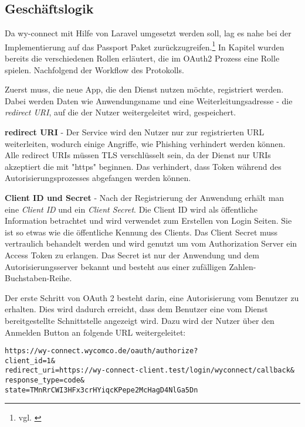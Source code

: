 
\subsection{Geschäftslogik}
\label{sec:Geschaeftslogik}

Da wy-connect mit Hilfe von Laravel umgesetzt werden soll, lag es nahe bei der Implementierung auf das Passport Paket zurückzugreifen.\footnote{vgl. \cite{Passport}}
In Kapitel  wurden bereits die verschiedenen Rollen erläutert, die im OAuth2 Prozess eine Rolle spielen. Nachfolgend der Workflow des Protokolls.

Zuerst muss, die neue App, die den Dienst nutzen möchte, registriert werden. Dabei werden Daten wie Anwendungsname und eine Weiterleitungsadresse - die \textit{redirect URI}, auf die der Nutzer weitergeleitet wird, gespeichert.

\textbf{redirect URI} -
Der Service wird den Nutzer nur zur registrierten URL weiterleiten, wodurch einige Angriffe, wie \zB Phishing verhindert werden können. Alle redirect URIs müssen TLS verschlüsselt sein, da der Dienst nur URIs akzeptiert die mit "https" beginnen. Das verhindert, dass Token während des Autorisierungsprozesses abgefangen werden können. 

\textbf{Client ID und Secret} -
Nach der Registrierung der Anwendung erhält man eine \textit{Client ID} und ein \textit{Client Secret}. Die Client ID wird als öffentliche Information betrachtet und wird verwendet zum Erstellen von Login Seiten. Sie ist so etwas wie die öffentliche Kennung des Clients. 
Das Client Secret muss vertraulich behandelt werden und wird genutzt um vom Authorization Server ein Access Token zu erlangen. Das Secret ist nur der Anwendung und dem Autorisierungsserver bekannt und besteht aus einer zufälligen Zahlen-Buchstaben-Reihe. 

Der erste Schritt von OAuth 2 besteht darin, eine Autorisierung vom Benutzer zu erhalten. Dies wird dadurch erreicht, dass dem Benutzer eine vom Dienst bereitgestellte Schnittstelle angezeigt wird. Dazu wird der Nutzer über den Anmelden Button an folgende URL weitergeleitet:

\texttt{https://wy-connect.wycomco.de/oauth/authorize?\\
client\_id=1\& \\
redirect\_uri=https://wy-connect-client.test/login/wyconnect/callback\& \\
response\_type=code\& \\
state=TMnRrCWI3HFx3crHYiqcKPepe2McHagD4NlGa5Dn
}

